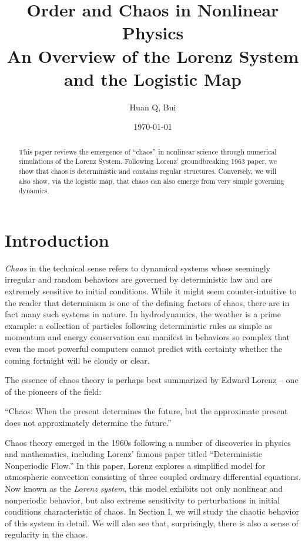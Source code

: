 \documentclass[twocolumn,amsmath,amssymb,aps]{revtex4}
\begin{document}
\title{Order and Chaos in Nonlinear Physics\\
	 An Overview of the Lorenz System and the Logistic Map}%
\author{Huan Q, Bui}
\date{\today}
\begin{abstract}
This paper reviews the emergence of ``chaos'' in nonlinear science through numerical simulations of the Lorenz System. Following Lorenz' groundbreaking 1963 paper, we show that chaos is deterministic and contains regular structures. Conversely, we will also show, via the logistic map, that chaos can also emerge from very simple governing dynamics.
\end{abstract}
\maketitle




\section{Introduction}
\textit{Chaos} in the technical sense refers to dynamical systems whose seemingly irregular and random behaviors are governed by deterministic law and are extremely sensitive to initial conditions. While it might seem counter-intuitive to the reader that determinism is one of the defining factors of chaos, there are in fact many such systems in nature. In hydrodynamics, the weather is a prime example: a collection of particles following deterministic rules as simple as momentum and energy conservation can manifest in behaviors so complex that even the most powerful computers cannot predict with certainty whether the coming fortnight will be cloudy or clear.  


The essence of chaos theory is perhaps best summarized by Edward Lorenz -- one of the pioneers of the field:
\begin{displayquote}
``Chaos: When the present determines the future, but the approximate present does not approximately determine the future.''\cite{lorenz_quote}
\end{displayquote}
Chaos theory emerged in the 1960s following a number of discoveries in physics and mathematics, including Lorenz' famous paper titled ``Deterministic Nonperiodic Flow.'' In this paper, Lorenz explores a simplified  model for atmospheric convection consisting of three coupled ordinary differential equations. Now known as the \textit{Lorenz} \textit{system}, this model exhibits not only nonlinear and nonperiodic behavior, but also extreme sensitivity to perturbations in initial conditions characteristic of chaos. In Section I, we will study the chaotic behavior of this system in detail. We will also see that, surprisingly, there is also a sense of regularity in the chaos. 
\end{document}
